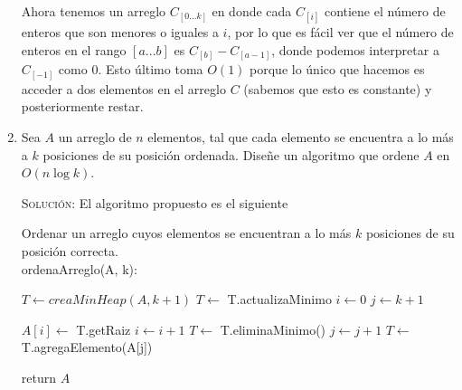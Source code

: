 \documentclass[letterpaper,11pt]{article}
\begin{document}
\begin{enumerate}
    Ahora tenemos un arreglo $C_{[0...k]}$ en donde cada $C_{[i]}$ contiene el 
    número de enteros que son menores o iguales a $i$, por lo que es fácil ver 
    que el número de enteros en el rango $[a...b]$ es $C_[b] - C_[a-1]$, donde 
    podemos interpretar a $C_{[-1]}$ como $0$. Esto último toma $O(1)$ porque 
    lo único que hacemos es acceder a dos elementos en el arreglo $C$ (sabemos 
    que esto es constante) y posteriormente restar. 

    \item Sea $A$ un arreglo de $n$ elementos, tal que cada elemento se 
    encuentra a lo más a $k$ posiciones de su posición ordenada. Diseñe un 
    algoritmo que ordene $A$ en $O(n \log k)$.

    \textsc{Solución:} El algoritmo propuesto es el siguiente 
    \begin{center}
        \begin{minipage}[c]{0.75\textwidth}
        \begin{algorithm}[H]
            \caption{Ordenar un arreglo cuyos elementos se encuentran a lo más 
                     $k$ posiciones de su posición correcta. \\ 
                     ordenaArreglo(A, k):} 
            \begin{algorithmic}[1]
                \State $T \gets creaMinHeap(A, k+1)$
                \State $T \gets$ T.actualizaMinimo
                \State $i \gets 0$
                \State $j \gets k + 1$

                    \State $A[i] \gets$ T.getRaiz
                    \State $i \gets i + 1$
                    \State $T \gets$ T.eliminaMinimo()
                        \State $j \gets j +1$
                        \State $T \gets$ T.agregaElemento(A[j])
                    \EndIf
                \EndWhile

                \State return $A$
            \end{algorithmic} 
        \end{algorithm}
        \end{minipage}
    \end{center}


\end{enumerate}
\end{document}
